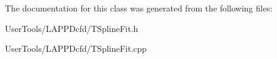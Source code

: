 The documentation for this class was generated from the following files\-:\begin{DoxyCompactItemize}
\item 
User\-Tools/\-L\-A\-P\-P\-Dcfd/T\-Spline\-Fit.\-h\item 
User\-Tools/\-L\-A\-P\-P\-Dcfd/T\-Spline\-Fit.\-cpp\end{DoxyCompactItemize}
